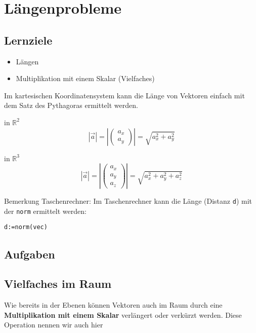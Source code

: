 \section{Längenprobleme}

\subsection*{Lernziele}
\begin{itemize}
\item Längen
\item Multiplikation mit einem Skalar (Vielfaches)
\end{itemize}

Im kartesischen Koordinatensystem kann die Länge von Vektoren einfach
mit dem Satz des Pythagoras ermittelt werden.

\begin{gesetz}{in $\mathbb{R}^2$}{}
  $$|\vec{a}| = \left| \begin{pmatrix} a_x\\a_y\end{pmatrix}  \right|   = \sqrt{a_x^2 + a_y^2}$$
\end{gesetz}

\begin{gesetz}{in $\mathbb{R}^3$}{}
  $$|\vec{a}| =  \left|\begin{pmatrix}a_x\\a_y\\a_z\end{pmatrix}\right| = \sqrt{a_x^2 + a_y^2 + a_z^2}$$
\end{gesetz}

Bemerkung Taschenrechner: Im Taschenrechner kann die Länge (Distanz
\texttt{d}) mit der \texttt{norm} ermittelt
werden:

\texttt{d:=norm(vec)}

\subsection*{Aufgaben}

\newpage


\subsection{Vielfaches im
  Raum}
Wie bereits in der Ebenen können Vektoren auch im Raum durch eine
\textbf{Multiplikation mit einem Skalar} verlängert oder
verkürzt werden. Diese Operation nennen wir auch hier 

